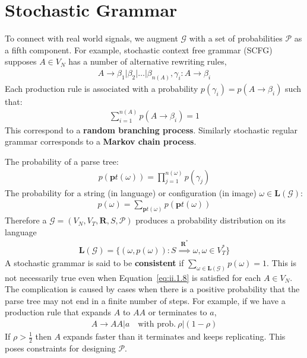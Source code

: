 \documentclass[10pt,oneside]{book}
\newcommand{\Eq}[1]{Equation~\ref{eq:#1}}
\begin{document}
\section{Stochastic Grammar}%
\label{sec:ii.1.4}
To connect with real world signals, we augment $\mathcal{G}$ with a set of
probabilities $\mathcal{P}$ as a fifth component. For example, stochastic
context free grammar (SCFG) supposes $A \in V_N$ has a number of alternative
rewriting rules,
%
\begin{align}
  \label{eq:ii.1.7}
  \tag{1.7}
  A \rightarrow \beta_1 \vert \beta_2 \vert \ldots \vert \beta_{n(A)},
  \gamma_i: A \rightarrow \beta_i
\end{align}
%
Each production rule is associated with a probability
$p(\gamma_i) = p(A \rightarrow \beta_i)$ such that:
%
\begin{align}
  \label{eq:ii.1.8}
  \tag{1.8}
  \sum^{n(A)}_{i=1} p(A \rightarrow \beta_i) = 1
\end{align}
%
This correspond to a \textbf{random branching process}. Similarly stochastic
regular grammar corresponds to a \textbf{Markov chain process}.

The probability of a parse tree:
%
\begin{align}
  \label{eq:ii.1.9}
  \tag{1.9}
  p(\mathbf{p}t(\omega)) = \prod^{n(\omega)}_{j=1} p(\gamma_j)
\end{align}
%
The probability for a string (in language) or configuration (in image)
$\omega \in \mathbf{L}(\mathcal{G})$:
%
\begin{align}
  \label{eq:ii.1.10}
  \tag{1.10}
  p(\omega) = \sum_{\mathbf{p}t(\omega)} p(\mathbf{p}t(\omega))
\end{align}
%
Therefore a $\mathcal{G} = (V_N, V_T, \mathbf{R}, S, \mathcal{P})$ produces a
probability distribution on its language
%
\begin{align}
  \label{eq:ii.1.11}
  \tag{1.11}
  \mathbf{L}(\mathcal{G}) = \{(\omega, p(\omega)):
    S \overset{\mathbf{R^*}}{\implies} \omega, \omega \in V^*_T\}
\end{align}
%
A stochastic grammar is said to be \textbf{consistent} if
$\sum_{\omega \in \mathbf{L}(\mathcal{G})} p(\omega) = 1$. This is not
necessarily true even when \Eq{ii.1.8} is satisfied for each $A \in V_N$. The
complication is caused by cases when there is a positive probability that the
parse tree may not end in a finite number of steps. For example, if we have a
production rule that expands $A$ to $AA$ or terminates to $a$,
%
\begin{align*}
  A \rightarrow AA \vert a \quad \text{with prob.}~\rho \vert (1 - \rho)
\end{align*}
%
If $\rho > \frac{1}{2}$ then $A$ expands faster than it terminates and keeps
replicating. This poses constraints for designing $\mathcal{P}$.
\end{document}
